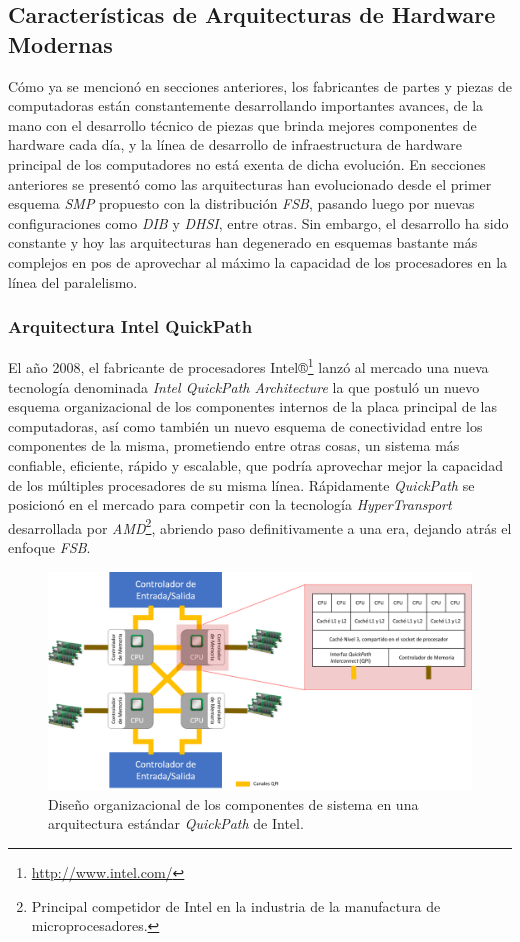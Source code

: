 \subsection{Características de Arquitecturas de Hardware Modernas}
Cómo ya se mencionó en secciones anteriores, los fabricantes de partes y piezas de computadoras están constantemente desarrollando importantes avances, de la mano con el desarrollo técnico de piezas que brinda mejores componentes de hardware cada día, y la línea de desarrollo de infraestructura de hardware principal de los computadores no está exenta de dicha evolución. En secciones anteriores se presentó como las arquitecturas han evolucionado desde el primer esquema \emph{SMP} propuesto con la distribución \emph{FSB}, pasando luego por nuevas configuraciones como \emph{DIB} y \emph{DHSI}, entre otras. Sin embargo, el desarrollo ha sido constante y hoy las arquitecturas han degenerado en esquemas bastante más complejos en pos de aprovechar al máximo la capacidad de los procesadores en la línea del paralelismo.

\subsubsection{Arquitectura Intel QuickPath}
El año 2008, el fabricante de procesadores Intel®\footnote{\url{http://www.intel.com/}} lanzó al mercado una nueva tecnología denominada \emph{Intel QuickPath Architecture} \cite{paper:quickpath} la que postuló un nuevo esquema organizacional de los componentes internos de la placa principal de las computadoras, así como también un nuevo esquema de conectividad entre los componentes de la misma, prometiendo entre otras cosas, un sistema más confiable, eficiente, rápido y escalable, que podría aprovechar mejor la capacidad de los múltiples procesadores de su misma línea. Rápidamente \emph{QuickPath} se posicionó en el mercado para competir con la tecnología \emph{HyperTransport} desarrollada por \emph{AMD}\footnote{Principal competidor de Intel en la industria de la manufactura de microprocesadores.}, abriendo paso definitivamente a una era, dejando atrás el enfoque \emph{FSB}.

\begin{figure}[!h]
	\centering
	\includegraphics[scale=.5]{imagenes/quickpath2.png}
	\caption{Diseño organizacional de los componentes de sistema en una arquitectura estándar \emph{QuickPath} de Intel.}
	\label{fig:quickpath}
\end{figure}

